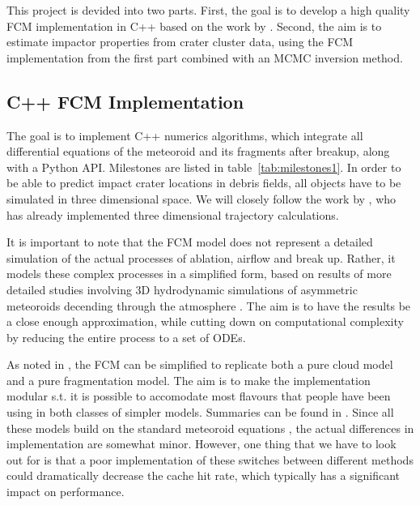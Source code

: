 This project is devided into two parts.
First, the goal is to develop a high quality FCM implementation in C++ based on the work by \cite{newland2019CFM18}.
Second, the aim is to estimate impactor properties from crater cluster data, using the FCM implementation from the first part combined with an MCMC inversion method.

\subsection{C++ FCM Implementation}
\label{sec:goal1}
The goal is to implement C++ numerics algorithms, which integrate all differential equations of the meteoroid and its fragments after breakup, along with a Python API.
Milestones are listed in table~\ref{tab:milestones1}.
In order to be able to predict impact crater locations in debris fields, all objects have to be simulated in three dimensional space.
We will closely follow the work by \cite{newland2019CFM18}, who has already implemented three dimensional trajectory calculations.

It is important to note that the FCM model does not represent a detailed simulation of the actual processes of ablation, airflow and break up.
Rather, it models these complex processes in a simplified form, based on results of more detailed studies involving 3D hydrodynamic simulations of asymmetric meteoroids decending through the atmosphere \citep[e.g.][]{artemieva1996interaction,artemieva2001motion}.
The aim is to have the results be a close enough approximation, while cutting down on computational complexity by reducing the entire process to a set of ODEs.

As noted in \cite{newland2019CFM18}, the FCM can be simplified to replicate both a pure cloud model and a pure fragmentation model.
The aim is to make the implementation modular s.t. it is possible to accomodate most flavours that people have been using in both classes of simpler models.
Summaries can be found in \cite{artemieva1996interaction,artemieva2001motion,register2017asteroid,mcmullan2019uncertainty}.
Since all these models build on the standard meteoroid equations \citep[e.g.][]{opik1958physics}, the actual differences in implementation are somewhat minor.
However, one thing that we have to look out for is that a poor implementation of these switches between different methods could dramatically decrease the cache hit rate, which typically has a significant impact on performance.

